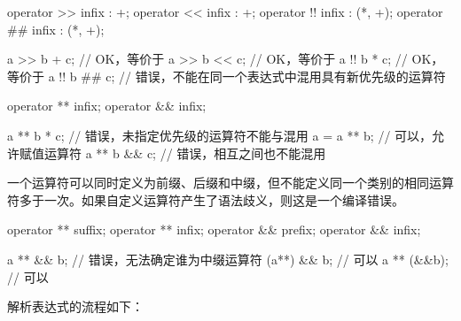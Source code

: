 \enterexample
\begin{codeblock}
operator >> infix : +;
operator << infix : +;
operator !! infix : (*, +);
operator ## infix : (*, +);

a >> b + c; // OK，等价于
a >> b << c; // OK，等价于
a !! b * c; // OK，等价于
a !! b ## c; // 错误，不能在同一个表达式中混用具有新优先级的运算符

operator ** infix;
operator && infix;

a ** b * c; // 错误，未指定优先级的运算符不能与\tcode{*}混用
a = a ** b; // 可以，允许赋值运算符
a ** b && c; // 错误，相互之间也不能混用
\end{codeblock}
\exitexample

\pnum
一个运算符可以同时定义为前缀、后缀和中缀，但不能定义同一个类别的相同运算符多于一次。如果自定义运算符产生了语法歧义，则这是一个编译错误。

\enterexample
\begin{codeblock}
operator ** suffix;
operator ** infix;
operator && prefix;
operator && infix;

a ** && b; // 错误，无法确定谁为中缀运算符
(a**) && b; // 可以
a ** (&&b); // 可以
\end{codeblock}
\exitexample

\pnum
解析表达式的流程如下：


